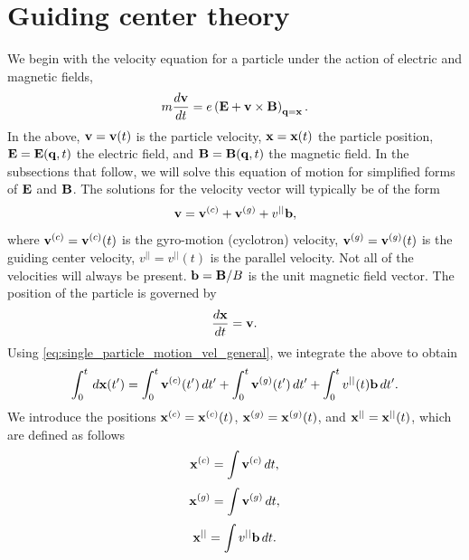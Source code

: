 \documentclass[a4paper,11pt]{report}
\begin{document}
\chapter{Guiding center theory}
We begin with the velocity equation for a particle under the action of electric and magnetic fields, 
\begin{equation}
\label{eq:single_particle_motion}
    m \frac{d \mathbf{v}}{dt} = e \left ( \mathbf{E} + \mathbf{v} \times \mathbf{B} \right )_{\mathbf{q} = \mathbf{x}}.
\end{equation}
In the above, $\mathbf{v} = \mathbf{v}(t)$ is the particle velocity, $\mathbf{x} = \mathbf{x}(t)$ the particle position, $\mathbf{E} = \mathbf{E}(\mathbf{q},t)$ the electric field, and $\mathbf{B} = \mathbf{B}(\mathbf{q},t)$ the magnetic field. In the subsections that follow, we will solve this equation of motion for simplified forms of $\mathbf{E}$ and $\mathbf{B}$. The solutions for the velocity vector will typically be of the form
\begin{equation}
    \label{eq:single_particle_motion_vel_general}
    \mathbf{v} = \mathbf{v}^{(c)} + \mathbf{v}^{(g)} + v^{||} \mathbf{b},
\end{equation}
where $\mathbf{v}^{(c)} = \mathbf{v}^{(c)}(t)$ is the gyro-motion (cyclotron) velocity, $\mathbf{v}^{(g)} = \mathbf{v}^{(g)}(t)$ is the guiding center velocity, $v^{||} = v^{||}(t)$ is the parallel velocity. Not all of the velocities will always be present. $\mathbf{b} = \mathbf{B} / B$ is the unit magnetic field vector. The position of the particle is governed by 
\begin{equation}
    \frac{d\mathbf{x}}{dt} = \mathbf{v}.
\end{equation}
Using \cref{eq:single_particle_motion_vel_general}, we integrate the above to obtain
\begin{equation}
    \label{eq:single_particle_motion_pos_eq_mod}
    \int_0^t \, d\mathbf{x}(t') = \int_0^t \mathbf{v}^{(c)}(t') \, dt' + \int_0^t \mathbf{v}^{(g)}(t') \, dt' + \int_0^t v^{||}(t) \mathbf{b} \, dt'.
\end{equation}
We introduce the positions $\mathbf{x}^{(c)} = \mathbf{x}^{(c)}(t)$, $\mathbf{x}^{(g)} = \mathbf{x}^{(g)}(t)$, and $\mathbf{x}^{||} = \mathbf{x}^{||}(t)$, which are defined as follows
\begin{equation}
    \mathbf{x}^{(c)} = \int \mathbf{v}^{(c)} \, dt,
\end{equation}
\begin{equation}
    \mathbf{x}^{(g)} = \int \mathbf{v}^{(g)} \, dt,
\end{equation}
\begin{equation}
    \mathbf{x}^{||} = \int v^{||} \mathbf{b} \, dt.
\end{equation}
\end{document}
